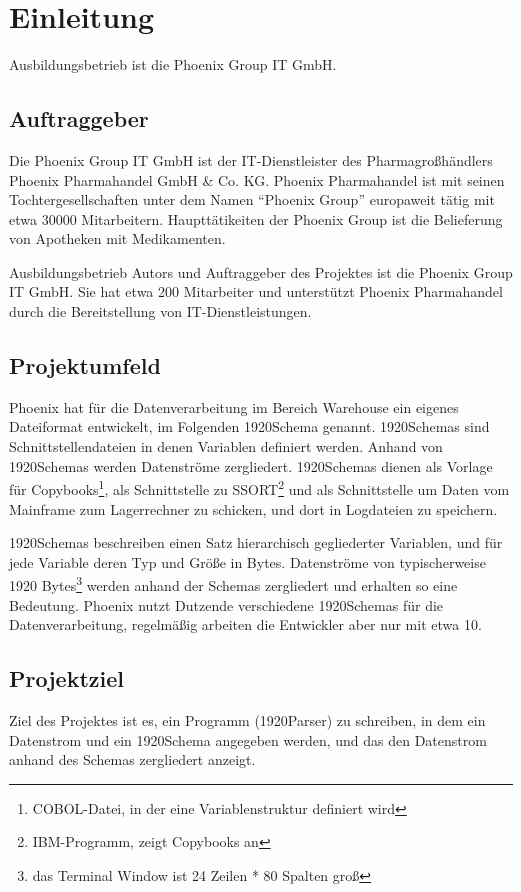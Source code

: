 \section{Einleitung}
\label{sec:Einleitung}
Ausbildungsbetrieb ist die Phoenix Group IT GmbH.

\subsection{Auftraggeber}
\label{sec:Auftraggeber}
Die Phoenix Group IT GmbH ist der IT-Dienstleister des Pharmagroßhändlers Phoenix Pharmahandel GmbH \& Co. KG. Phoenix Pharmahandel ist mit seinen Tochtergesellschaften unter dem Namen ``Phoenix Group'' europaweit tätig mit etwa 30000 Mitarbeitern. Haupttätikeiten der Phoenix Group ist die Belieferung von Apotheken mit Medikamenten.

Ausbildungsbetrieb Autors und Auftraggeber des Projektes ist die Phoenix Group IT GmbH. Sie hat etwa 200 Mitarbeiter und unterstützt Phoenix Pharmahandel durch die Bereitstellung von IT-Dienstleistungen.

\subsection{Projektumfeld} 
\label{sec:Projektumfeld}
Phoenix hat für die Datenverarbeitung im Bereich Warehouse ein eigenes Dateiformat entwickelt, im Folgenden 1920Schema genannt. 1920Schemas sind Schnittstellendateien in denen Variablen definiert werden. Anhand von 1920Schemas werden Datenströme zergliedert. 1920Schemas dienen als Vorlage für Copybooks\footnote{COBOL-Datei, in der eine Variablenstruktur definiert wird}, als Schnittstelle zu SSORT\footnote{IBM-Programm, zeigt Copybooks an} und als Schnittstelle um Daten vom Mainframe zum Lagerrechner zu schicken, und dort in Logdateien zu speichern.

1920Schemas beschreiben einen Satz hierarchisch gegliederter Variablen, und für jede Variable deren Typ und Größe in Bytes. Datenströme von typischerweise 1920 Bytes\footnote{das Terminal Window ist 24 Zeilen * 80 Spalten groß} werden anhand der Schemas zergliedert und erhalten so eine Bedeutung. Phoenix nutzt Dutzende verschiedene 1920Schemas für die Datenverarbeitung, regelmäßig arbeiten die Entwickler aber nur mit etwa 10.

\subsection{Projektziel} 
\label{sec:Projektziel}
Ziel des Projektes ist es, ein Programm (1920Parser) zu schreiben, in dem ein Datenstrom und ein 1920Schema angegeben werden, und das den Datenstrom anhand des Schemas zergliedert anzeigt.


